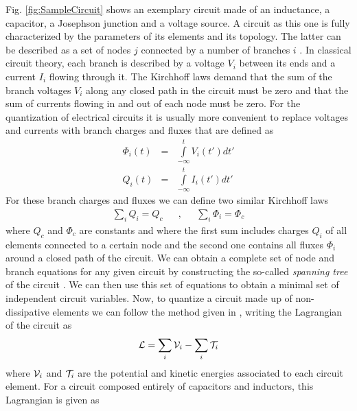 Fig. \ref{fig:SampleCircuit} shows an exemplary circuit made of an inductance, a capacitor, a Josephson junction and a voltage source. A circuit as this one is fully characterized by the parameters of its elements and its topology. The latter can be described as a set of nodes $j$ connected by a number of branches $i$ . In classical circuit theory, each branch is described by a voltage $V_i$ between its ends and a current $I_{i}$ flowing through it. The Kirchhoff laws demand that the sum of the branch voltages $V_i$ along any closed path in the circuit must be zero and that the sum of currents flowing in and out of each node must be zero. For the quantization of electrical circuits it is usually more convenient to replace voltages and currents with branch charges and fluxes that are defined as
%
\begin{eqnarray}
\Phi_i(t) & = & \int\limits_{-\infty}^t V_i(t') dt' \\
Q_i(t) & = & \int\limits_{-\infty}^t I_i(t') dt'
\end{eqnarray}
%
For these branch charges and fluxes we can define two similar Kirchhoff laws
%
\begin{align}
\sum\limits_{i} Q_i  =  Q_c & & , & & \sum\limits_{i}\Phi_i = \Phi_c \label{eq:kirchhoff_charge}
\end{align}
%
where $Q_c$ and $\Phi_c$ are constants and where the first sum includes charges $Q_i$ of all elements connected to a certain node and the second one contains all fluxes $\Phi_i$ around a closed path of the circuit. We can obtain a complete set of node and branch equations for any given circuit by constructing the so-called {\it spanning tree} of the circuit \citep{devoret_quantum_1995}. We can then use this set of equations to obtain a minimal set of independent circuit variables. Now, to quantize a circuit made up of non-dissipative elements we can follow the method given in \cite{yurke_quantum_1984}, writing the Lagrangian of the circuit as 
%
\begin{equation}
\begin{mathcal}L\end{mathcal} = \sum\limits_i \begin{mathcal}V\end{mathcal}_i - \sum\limits_i \begin{mathcal}T\end{mathcal}_i
\end{equation}
%
where $\begin{mathcal}V\end{mathcal}_i$ and $\begin{mathcal}T\end{mathcal}_i$ are the potential and kinetic energies associated to each circuit element. For a circuit composed entirely of capacitors and inductors, this Lagrangian is given as
